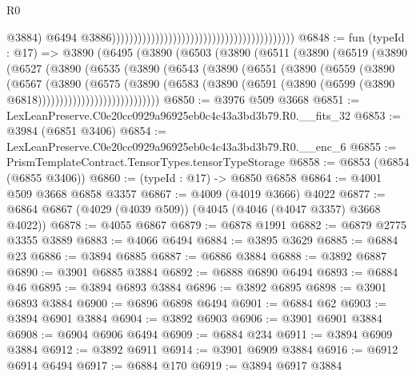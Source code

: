 \begin{lexlean}{R0}
\begin{coremodule}
                                                                                          @3884)
                                                                                        @6494
                                                                                        @3886))))))))))))))))))))))))))))))))))))))))))
@6848 := fun (typeId : @17) =>
  @3890
    (@6495
      (@3890
        (@6503
          (@3890
            (@6511
              (@3890
                (@6519
                  (@3890
                    (@6527
                      (@3890
                        (@6535
                          (@3890
                            (@6543
                              (@3890
                                (@6551
                                  (@3890
                                    (@6559
                                      (@3890
                                        (@6567
                                          (@3890
                                            (@6575
                                              (@3890
                                                (@6583
                                                  (@3890
                                                    (@6591
                                                      (@3890
                                                        (@6599
                                                          (@3890 @6818))))))))))))))))))))))))))))
@6850 := @3976 @509 @3668
@6851 := LexLeanPreserve.C0e20cc0929a96925eb0c4c43a3bd3b79.R0.__fits_32
@6853 := @3984 (@6851 @3406)
@6854 := LexLeanPreserve.C0e20cc0929a96925eb0c4c43a3bd3b79.R0.__enc_6
@6855 := PrismTemplateContract.TensorTypes.tensorTypeStorage
@6858 := @6853 (@6854 (@6855 @3406))
@6860 := (typeId : @17) -> @6850 @6858
@6864 := @4001 @509 @3668 @6858 @3357
@6867 := @4009 (@4019 @3666) @4022
@6877 := @6864 @6867 (@4029 (@4039 @509)) (@4045 (@4046 (@4047 @3357) @3668 @4022))
@6878 := @4055 @6867
@6879 := @6878 @1991
@6882 := @6879 @2775 @3355 @3889
@6883 := @4066 @6494
@6884 := @3895 @3629
@6885 := @6884 @23
@6886 := @3894 @6885
@6887 := @6886 @3884
@6888 := @3892 @6887
@6890 := @3901 @6885 @3884
@6892 := @6888 @6890 @6494
@6893 := @6884 @46
@6895 := @3894 @6893 @3884
@6896 := @3892 @6895
@6898 := @3901 @6893 @3884
@6900 := @6896 @6898 @6494
@6901 := @6884 @62
@6903 := @3894 @6901 @3884
@6904 := @3892 @6903
@6906 := @3901 @6901 @3884
@6908 := @6904 @6906 @6494
@6909 := @6884 @234
@6911 := @3894 @6909 @3884
@6912 := @3892 @6911
@6914 := @3901 @6909 @3884
@6916 := @6912 @6914 @6494
@6917 := @6884 @170
@6919 := @3894 @6917 @3884

\end{coremodule}
\end{lexlean}
